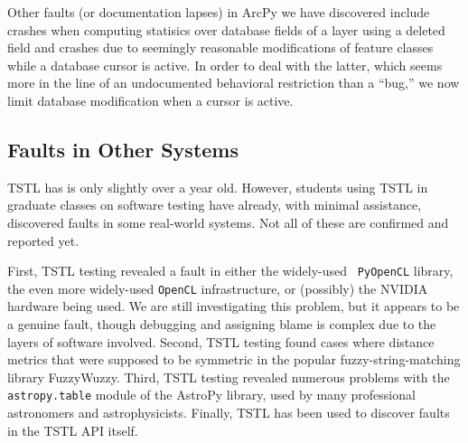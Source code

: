 Other faults (or documentation lapses) in ArcPy we have discovered include crashes when computing
statisics over database fields of a layer using a deleted field and
crashes due to seemingly reasonable modifications of feature classes
while a database cursor is active.  In order to deal with the latter,
which seems more in the line of an undocumented behavioral restriction
than a ``bug,'' we now limit database modification when a cursor is active.

\subsection{Faults in Other Systems}

TSTL has is only slightly over a year old.  However, students using
TSTL in graduate classes on software testing have already, with
minimal assistance, discovered faults in some real-world systems.  Not
all of these are confirmed and reported yet.

First, TSTL testing revealed a fault in either the widely-used {\tt
  PyOpenCL} library, the even more widely-used {\tt OpenCL}
infrastructure, or (possibly) the NVIDIA hardware being used.  We are
still investigating this problem, but it appears to be a genuine
fault, though debugging and assigning blame is complex due to the
layers of software involved.  Second, TSTL testing found cases where distance metrics that were supposed to
be symmetric in the popular fuzzy-string-matching library FuzzyWuzzy.
Third, TSTL testing revealed numerous problems with the {\tt
  astropy.table} module of the AstroPy
library, used by many professional astronomers and astrophysicists.
Finally, TSTL has been used to discover faults in the TSTL API itself.